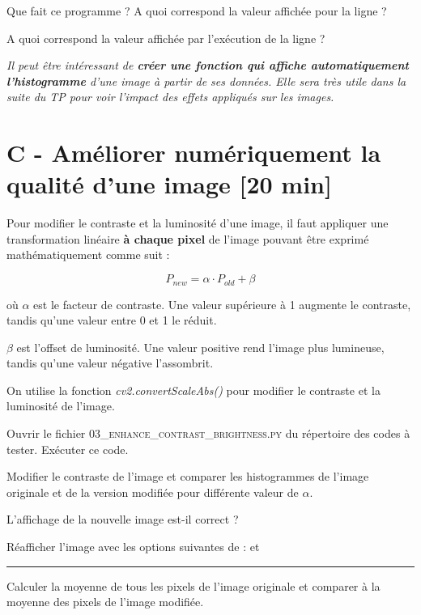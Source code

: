 \Quest Que fait ce programme ? A quoi correspond la valeur affichée pour la ligne  ?

\Quest A quoi correspond la valeur affichée par l'exécution de la ligne  ?

\bigskip

\textit{Il peut être intéressant de \textbf{créer une fonction qui affiche automatiquement l'histogramme} d'une image à partir de ses données. Elle sera très utile dans la suite du TP pour voir l'impact des effets appliqués sur les images.}


\section{C - Améliorer numériquement la qualité d'une image {[20 min]}}

Pour modifier le contraste et la luminosité d'une image, il faut appliquer une transformation linéaire \textbf{à chaque pixel} de l'image pouvant être exprimé mathématiquement comme suit :

$$P_{new} = \alpha \cdot P_{old} + \beta$$

où $\alpha$ est le facteur de contraste. Une valeur supérieure à 1 augmente le contraste, tandis qu'une valeur entre 0 et 1 le réduit.

$\beta$ est l'offset de luminosité. Une valeur positive rend l'image plus lumineuse, tandis qu'une valeur négative l'assombrit.

\medskip

On utilise la fonction \textsl{cv2.convertScaleAbs()} pour modifier le contraste et la luminosité de l'image.

\bigskip

\Manip Ouvrir le fichier \textsc{03\_enhance\_contrast\_brightness.py} du répertoire des codes à tester. Exécuter ce code.

\Manip Modifier le contraste de l'image et comparer les histogrammes de l'image originale et de la version modifiée pour différente valeur de $\alpha$.

\Quest L'affichage de la nouvelle image est-il correct ?

\Manip Réafficher l'image avec les options suivantes de  :  et 

\noindent \rule{\linewidth}{1pt}

\Manip Calculer la moyenne de tous les pixels de l'image originale et comparer à la moyenne des pixels de l'image modifiée.

